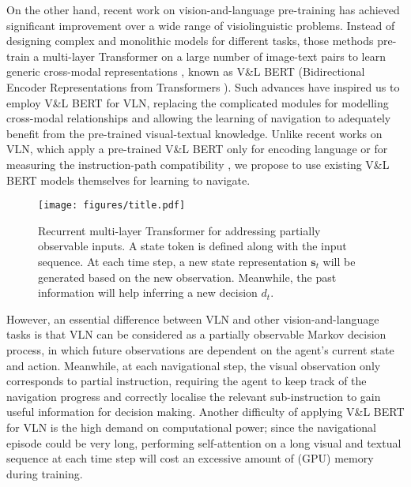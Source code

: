 \documentclass[final]{cvpr}
\begin{document}
On the other hand, recent work on vision-and-language pre-training has achieved significant improvement over a wide range of visiolinguistic problems. Instead of designing complex and monolithic models for different tasks, those methods pre-train a multi-layer Transformer \cite{vaswani2017attention} on a large number of image-text pairs to learn generic cross-modal representations \cite{chen2020uniter,li2020unicoder,li2019visualbert,li2020oscar, lu2019vilbert,su2019vl,tan2019lxmert}, known as V\&L BERT (Bidirectional Encoder Representations from Transformers \cite{devlin2019bert}). Such advances have inspired us to employ V\&L BERT for VLN, replacing the complicated modules for modelling cross-modal relationships and allowing the learning of navigation to adequately benefit from the pre-trained visual-textual knowledge. Unlike recent works on VLN, which apply a pre-trained V\&L BERT only for encoding language \cite{hao2020towards,li2019robust} or for measuring the instruction-path compatibility \cite{majumdar2020improving}, we propose to use existing V\&L BERT models themselves for learning to navigate.

\begin{figure}[t]
  \centering
  \texttt{[image: figures/title.pdf]}
  \caption{Recurrent multi-layer Transformer for addressing partially observable inputs. A state token is defined along with the input sequence. At each time step, a new state representation $\boldsymbol{s}_{t}$ will be generated based on the new observation. Meanwhile, the past information will help inferring a new decision $d_{t}$.}
  \label{fig:title}
  \vspace{-1em}
\end{figure}

However, an essential difference between VLN and other vision-and-language tasks is that VLN can be considered as a partially observable Markov decision process, in which future observations are dependent on the agent's current state and action. Meanwhile, at each navigational step, the visual observation only corresponds to partial instruction, requiring the agent to keep track of the navigation progress and correctly localise the relevant sub-instruction to gain useful information for decision making. Another difficulty of applying V\&L BERT for VLN is the high demand on computational power; since the navigational episode could be very long, performing self-attention on a long visual and textual sequence at each time step will cost an excessive amount of (GPU) memory during training.
\end{document}
